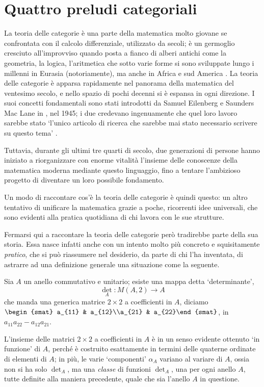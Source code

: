 \chapter{Quattro preludi categoriali}\label{cap_preludi}
La teoria delle categorie è una parte della matematica molto giovane se confrontata con il calcolo differenziale, utilizzato da secoli; è un germoglio cresciuto all'improvviso quando posta a fianco di alberi antichi come la geometria, la logica, l'aritmetica che sotto varie forme si sono sviluppate lungo i millenni in Eurasia (notoriamente), ma anche in Africa e sud America \cite{ascher1991ethnomathematics}. La teoria delle categorie è apparsa rapidamente nel panorama della matematica del ventesimo secolo, e nello spazio di pochi decenni si è espansa in ogni direzione. I suoi concetti fondamentali sono stati introdotti da Samuel Eilenberg e Saunders Mac Lane in \cite{gtone}, nel 1945; i due credevano ingenuamente che quel loro lavoro sarebbe stato `l'unico articolo di ricerca che sarebbe mai stato necessario scrivere su questo tema' \cite{maclane1988concepts}.

Tuttavia, durante gli ultimi tre quarti di secolo, due generazioni di persone %
hanno iniziato a riorganizzare con enorme vitalità l'insieme delle conoscenze della matematica moderna mediante questo linguaggio, fino a tentare l'ambizioso progetto di diventare un loro possibile fondamento.

Un modo di raccontare cos'è la teoria delle categorie è quindi questo: un altro tentativo di unificare la matematica grazie a poche, ricorrenti idee universali, che sono evidenti alla pratica quotidiana di chi lavora con le sue strutture.
\medskip

Fermarsi qui a raccontare la teoria delle categorie però tradirebbe parte della sua storia. Essa nasce infatti anche con un intento molto più concreto e squisitamente \emph{pratico}, che si può riassumere nel desiderio, da parte di chi l'ha inventata, di astrarre ad una definizione generale una situazione come la seguente.
\begin{example}
	Sia \(A\) un anello commutativo e unitario; esiste una mappa detta `determinante',
	\[\textstyle\det_A : M(A,2) \to A\]
	che manda una generica matrice \(2\times 2\) a coefficienti in \(A\), diciamo \(\begin{smat} a_{11} & a_{12}\\a_{21} & a_{22}\end{smat}\), in \(a_{11}a_{22}-a_{12}a_{21}\).
\end{example}
L'insieme delle matrici \(2\times 2\) a coefficienti in \(A\) è in un senso evidente ottenuto `in funzione' di \(A\), perché è costruito esattamente in termini delle quaterne ordinate di elementi di \(A\); in più, le varie `componenti' \(\alpha_A\) variano al variare di \(A\), ossia non si ha solo \(\det_A\), ma una \emph{classe} di funzioni \(\det_A\), una per ogni anello \(A\), tutte definite alla maniera precedente, quale che sia l'anello \(A\) in questione.

